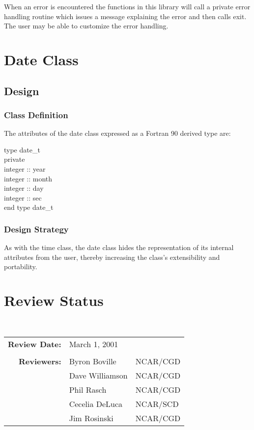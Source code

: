 \documentclass[]{article}
\begin{document}
When an error is encountered the functions in this library will call a private error handling routine 
which issues a message explaining the error and then calls exit. The user may be able to customize the
error handling.

\section{Date Class}



\subsection{Design}

\subsubsection{Class Definition}

The attributes of the date class expressed as a Fortran 90 derived type are:

\noindent type date\_t \\
\indent private \\
\indent integer :: year \\
\indent integer :: month \\
\indent integer :: day \\
\indent integer :: sec \\
\noindent end type date\_t

\subsubsection{Design Strategy}

As with the time class, the date class hides the representation of its internal attributes from the 
user, thereby increasing the class's extensibility and portability.

\section{Review Status}

 \\

\begin{tabular}{r p{1.3in} p{2in}}
{\bf Review Date:} & March 1, 2001 \\ \\
{\bf Reviewers:}   & Byron Boville        & NCAR/CGD \\
                   & Dave Williamson      & NCAR/CGD \\
                   & Phil Rasch           & NCAR/CGD \\
                   & Cecelia DeLuca       & NCAR/SCD \\
                   & Jim Rosinski         & NCAR/CGD
\end{tabular}
\end{document}
